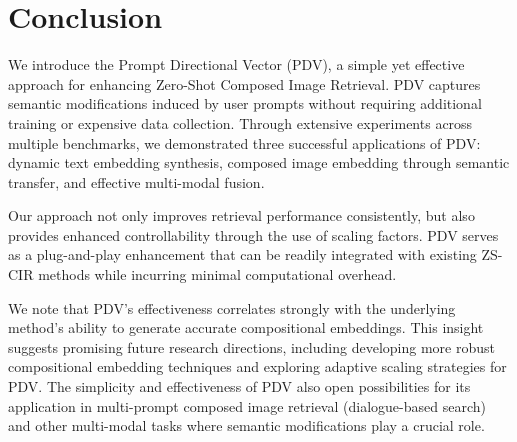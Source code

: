 \section{Conclusion}
\label{sec:con}
We introduce the Prompt Directional Vector (PDV), a simple yet effective approach for enhancing Zero-Shot Composed Image Retrieval. PDV captures semantic modifications induced by user prompts without requiring additional training or expensive data collection. Through extensive experiments across multiple benchmarks, we demonstrated three successful applications of PDV: dynamic text embedding synthesis, composed image embedding through semantic transfer, and effective multi-modal fusion. 

Our approach not only improves retrieval performance consistently, but also provides enhanced controllability through the use of scaling factors. PDV serves as a plug-and-play enhancement that can be readily integrated with existing ZS-CIR methods while incurring minimal computational overhead.

We note that PDV's effectiveness correlates strongly with the underlying method's ability to generate accurate compositional embeddings. This insight suggests promising future research directions, including developing more robust compositional embedding techniques and exploring adaptive scaling strategies for PDV. The simplicity and effectiveness of PDV also open possibilities for its application in multi-prompt composed image retrieval (\ie dialogue-based search) and other multi-modal tasks where semantic modifications play a crucial role.
